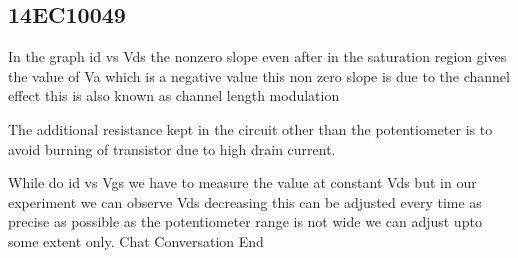 \documentclass[12pt]{extarticle}
\begin{document}
\subsection*{14EC10049}
 
In the graph id vs Vds the nonzero slope even after in the saturation region gives the value of Va which is a negative value this non zero slope is due to the channel effect this is also known as channel length modulation

The additional resistance kept in the circuit other than the potentiometer is to avoid burning of transistor due to high drain current.

While do id vs Vgs we have to measure the value at constant Vds but in our experiment we can observe Vds decreasing this can be adjusted every time as precise as possible as the potentiometer range is not wide we can adjust upto some extent only.
Chat Conversation End
\end{document}

